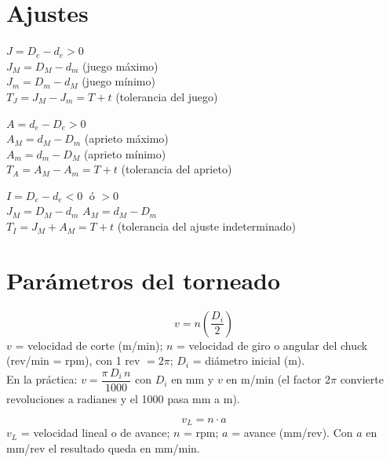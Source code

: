 \documentclass[12pt,a4paper]{article}
\begin{document}
\section{Ajustes}

\begin{formu}
	$J = D_e - d_e > 0$\\
	$J_M = D_M - d_m$ (juego máximo)\\
	$J_m = D_m - d_M$ (juego mínimo)\\
	$T_J = J_M - J_m = T + t$ (tolerancia del juego)
\end{formu}

\begin{formu}
	$A = d_e - D_e > 0$\\
	$A_M = d_M - D_m$ (aprieto máximo)\\
	$A_m = d_m - D_M$ (aprieto mínimo)\\
	$T_A = A_M - A_m = T + t$ (tolerancia del aprieto)
\end{formu}

\begin{formu}
	$I = D_e - d_e < 0 \;\text{ ó } > 0$\\
	$J_M = D_M - d_m$ \qquad $A_M = d_M - D_m$\\
	$T_I = J_M + A_M = T + t$ (tolerancia del ajuste indeterminado)
\end{formu}

\section{Parámetros del torneado}

\begin{formu}
	\[ v = n\left(\frac{D_i}{2}\right) \]
	$v$ = velocidad de corte (m/min); $n$ = velocidad de giro o angular del chuck
	(rev/min = rpm), con 1 rev $= 2\pi$; $D_i$ = diámetro inicial (m).\\
	En la práctica: $v = \dfrac{\pi\, D_i\, n}{1000}$ con $D_i$ en mm y $v$ en
	m/min
	(el factor $2\pi$ convierte revoluciones a radianes y el 1000 pasa mm a m).
\end{formu}

\begin{formu}
	\[ v_L = n\cdot a \]
	$v_L$ = velocidad lineal o de avance; $n$ = rpm; $a$ = avance (mm/rev). Con
	$a$
	en mm/rev el resultado queda en mm/min.
\end{formu}
\end{document}
